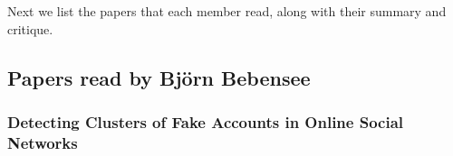 Next we list the papers that each member read,
along with their summary and critique.





\subsection{Papers read by Björn Bebensee}

\subsubsection{Detecting Clusters of Fake Accounts in Online Social Networks}

